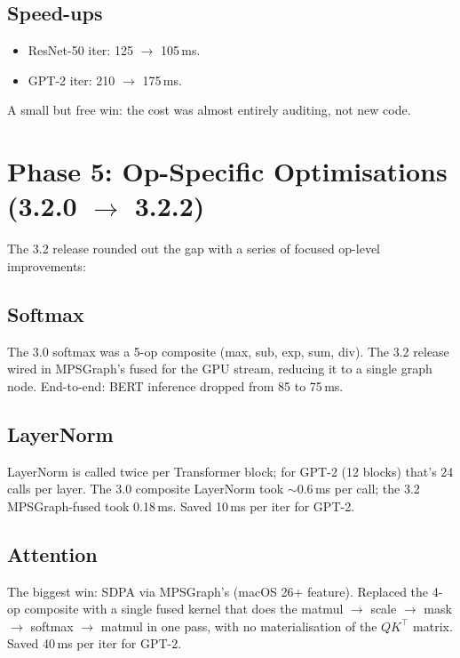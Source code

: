 \subsection{Speed-ups}
\label{ssec:stabilization:phase_4_speedups}

\begin{itemize}
  \item ResNet-50 iter: 125 $\to$ 105\,ms.
  \item GPT-2 iter: 210 $\to$ 175\,ms.
\end{itemize}

A small but free win: the cost was almost entirely auditing,
not new code.

\section{Phase 5: Op-Specific Optimisations (3.2.0 $\to$ 3.2.2)}
\label{sec:stabilization:phase_5}

The 3.2 release rounded out the gap with a series of focused
op-level improvements:

\subsection{Softmax}
\label{ssec:stabilization:softmax}

The 3.0 softmax was a 5-op composite (max, sub, exp, sum, div).
The 3.2 release wired in MPSGraph's fused
 for the GPU stream, reducing it
to a single graph node. End-to-end: BERT inference dropped
from 85 to 75\,ms.

\subsection{LayerNorm}
\label{ssec:stabilization:layernorm}

LayerNorm is called twice per Transformer block; for GPT-2
(12 blocks) that's 24 calls per layer. The 3.0 composite
LayerNorm took $\sim$0.6\,ms per call; the 3.2 MPSGraph-fused
 took 0.18\,ms. Saved 10\,ms
per iter for GPT-2.

\subsection{Attention}
\label{ssec:stabilization:attention}

The biggest win: SDPA via MPSGraph's
(macOS 26+ feature). Replaced the 4-op composite with a single
fused kernel that does the matmul $\to$ scale $\to$ mask $\to$
softmax $\to$ matmul in one pass, with no materialisation of
the $QK^\top$ matrix. Saved 40\,ms per iter for GPT-2.


